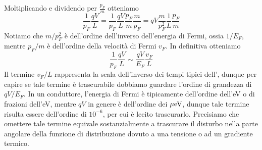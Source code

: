 Moltiplicando e dividendo per $\frac{p_F}{m}$ otteniamo
\begin{equation*}
    \frac{1}{p_F} \frac{qV}{L}
    =\frac{1}{p_F} \frac{qV}{L} \frac{p_F}{m} \frac{m}{p_F}
    =qV \frac{m}{p_F^2} \frac{1}{L} \frac{p_F}{m}
\end{equation*}
Notiamo che $m/p_F^2$ è dell'ordine dell'inverso dell'energia di Fermi, ossia $1/E_F$, mentre $p_F/m$ è dell'ordine della velocità di Fermi $v_F$. In definitiva otteniamo
\begin{equation*}
    \frac{1}{p_F} \frac{qV}{L}
    \sim \frac{qV}{E_F} \frac{v_F}{L}
\end{equation*}
Il termine $v_F/L$ rappresenta la scala dell'inverso dei tempi tipici dell', dunque per capire se tale termine è trascurabile dobbiamo guardare l'ordine di grandezza di $qV/E_F$. In un conduttore, l'energia di Fermi è tipicamente dell'ordine dell'eV o di frazioni dell'eV, mentre $qV$ in genere è dell'ordine dei $\rm \mu eV$, dunque tale termine risulta essere dell'ordine di $10^{-6}$, per cui è lecito trascurarlo. Precisiamo che omettere tale termine equivale sostanzialmente a trascurare il disturbo nella parte angolare della funzione di distribuzione dovuto a una tensione o ad un gradiente termico.

